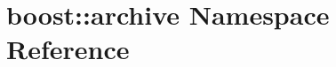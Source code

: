 \hypertarget{namespaceboost_1_1archive}{\section{boost\-:\-:archive Namespace Reference}
\label{namespaceboost_1_1archive}
}
